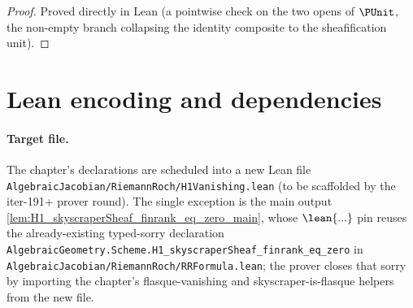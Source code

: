 \begin{proof}\leanok
 Proved directly in Lean (a pointwise check on the two
  opens of \(\PUnit\), the non-empty branch collapsing the identity
  composite to the sheafification unit).
\end{proof}

\section{Lean encoding and dependencies}
\label{sec:H1Vanishing_lean_encoding}

\paragraph{Target file.} The chapter's declarations are scheduled into a
new Lean file \texttt{AlgebraicJacobian/RiemannRoch/H1Vanishing.lean}
(to be scaffolded by the iter-191+ prover round). The single exception
is the main output \cref{lem:H1_skyscraperSheaf_finrank_eq_zero_main},
whose \(\lean{...}\) pin reuses the already-existing typed-sorry
declaration
\texttt{AlgebraicGeometry.Scheme.H1\_skyscraperSheaf\_finrank\_eq\_zero}
in \texttt{AlgebraicJacobian/RiemannRoch/RRFormula.lean}; the prover
closes that sorry by importing the chapter's flasque-vanishing and
skyscraper-is-flasque helpers from the new file.

